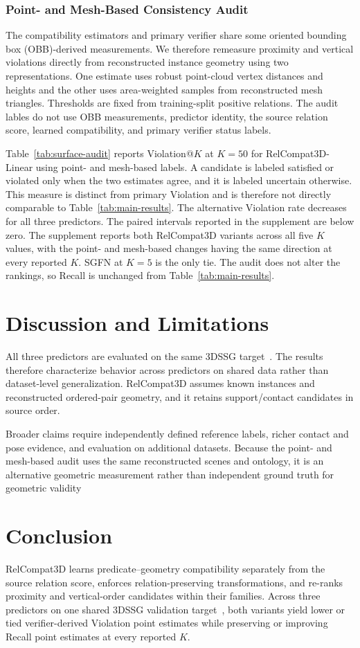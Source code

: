 \subsubsection{Point- and Mesh-Based Consistency Audit}
The compatibility estimators and primary verifier share some oriented bounding box (OBB)-derived measurements. We therefore remeasure proximity and vertical violations directly from reconstructed instance geometry using two representations. One estimate uses robust point-cloud vertex distances and heights and the other uses area-weighted samples from reconstructed mesh triangles. Thresholds are fixed from training-split positive relations. The audit lables do not use OBB measurements, predictor identity, the source relation score, learned compatibility, and primary verifier status labels.

Table~\ref{tab:surface-audit} reports Violation@$K$ at $K=50$ for RelCompat3D-Linear using point- and mesh-based labels. A candidate is labeled satisfied or violated only when the two estimates agree, and it is labeled uncertain otherwise. This measure is distinct from primary Violation and is therefore not directly comparable to Table~\ref{tab:main-results}. The alternative Violation rate decreases for all three predictors. The paired intervals reported in the supplement are below zero. The supplement reports both RelCompat3D variants across all five $K$ values, with the point- and mesh-based changes having the same direction at every reported $K$. SGFN at $K=5$ is the only tie. The audit does not alter the rankings, so Recall is unchanged from Table~\ref{tab:main-results}.

\section{Discussion and Limitations}

All three predictors are evaluated on the same 3DSSG target~\cite{wald2020learning}. The results therefore characterize behavior across predictors on shared data rather than dataset-level generalization. RelCompat3D assumes known instances and reconstructed ordered-pair geometry, and it retains support/contact candidates in source order.
 
Broader claims require independently defined reference labels, richer contact and pose evidence, and evaluation on additional datasets. Because the point- and mesh-based audit uses the same reconstructed scenes and ontology, it is an alternative geometric measurement rather than independent ground truth for geometric validity

\section{Conclusion}
RelCompat3D learns predicate--geometry compatibility separately from the source relation score, enforces relation-preserving transformations, and re-ranks proximity and vertical-order candidates within their families. Across three predictors on one shared 3DSSG validation target~\cite{wald2020learning}, both variants yield lower or tied verifier-derived Violation point estimates while preserving or improving Recall point estimates at every reported $K$.